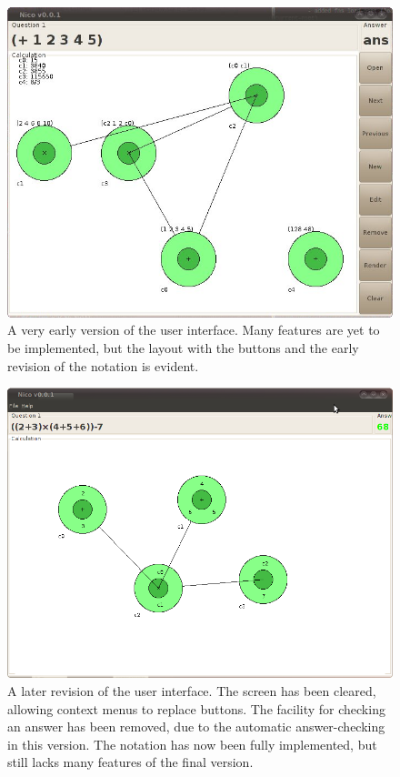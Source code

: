 \documentclass[12pt,twoside,notitlepage,xetex]{report}
\begin{document}
{\begin{center}
\begin{figure}[H]
\begin{center}
\includegraphics[width=\textwidth-4cm]{figs/nico_screen_oldest.png}
\end{center}
\caption{A very early version of the user interface.  Many features are yet to be implemented, but the layout with the buttons and the early revision of the notation is evident.}
\label{fig:OldApps1}
\end{figure}
\end{center}

\begin{center}
\begin{figure}[H]
\begin{center}
\includegraphics[width=\textwidth-4cm]{figs/nico_screen_older.png}
\end{center}
\caption{A later revision of the user interface.  The screen has been cleared, allowing context menus to replace buttons.  The facility for checking an answer has been removed, due to the automatic answer-checking in this version.  The notation has now been fully implemented, but still lacks many features of the final version.}
\label{fig:OldApps2}
\end{figure}
\end{center}

}
\end{document}
